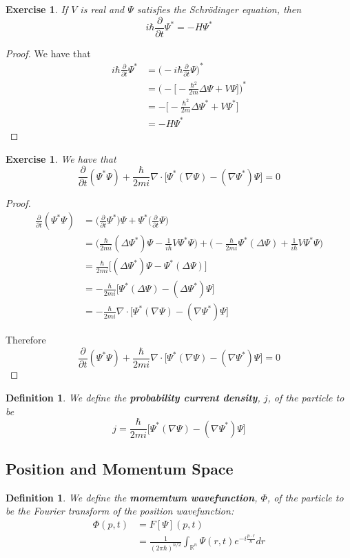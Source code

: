 \documentclass[12pt]{amsart}
\newtheorem{defn}[thm]{Definition}
\newtheorem{ex}[thm]{Exercise}
\newcommand{\Del}{\Delta}
\newcommand{\R}{\mathbb{R}}
\newcommand{\p}[1]{\frac{\partial}{\partial{#1}}}
\begin{document}
\begin{ex}
If $V$ is real and $\Psi$ satisfies the Schr\"{o}dinger equation, then $$i\hbar \p{t} \Psi^* = -H\Psi^* $$
\end{ex}

\begin{proof}
We have that 
\begin{align*}
i \hbar \p{t} \Psi^{*} 
&= \bigg(-i \hbar \p{t} \Psi\bigg)^*\\
&=\bigg( - \bigg[-\frac{\hbar^2}{2m}\Del \Psi + V \Psi \bigg] \bigg)^*\\
&= - \bigg[ -\frac{\hbar^2}{2m}\Del \Psi^* + V \Psi^*\bigg]\\
&= -H \Psi^*
\end{align*}
\end{proof}

\begin{ex}
We have that $$\p{t} (\Psi^* \Psi) + \frac{\hbar}{2mi} \nabla \cdot \bigg[ \Psi^* (\nabla \Psi) - (\nabla \Psi^*) \Psi\bigg] = 0 $$
\end{ex}

\begin{proof}
\begin{align*}
\p{t}(\Psi^* \Psi) 
&= \bigg(\p{t} \Psi^* \bigg) \Psi + \Psi^* \bigg(\p{t} \Psi \bigg)\\
&= \bigg( \frac{\hbar}{2mi} (\Del \Psi^*) \Psi - \frac{1}{i \hbar }V \Psi^* \Psi\bigg) + \bigg( -\frac{\hbar}{2mi}  \Psi^* (\Del \Psi) + \frac{1}{i \hbar }V \Psi^* \Psi \bigg)\\
&= \frac{\hbar}{2mi} \bigg[ (\Del \Psi^*) \Psi - \Psi^* (\Del \Psi) \bigg]\\
&= -\frac{\hbar}{2mi} \bigg[ \Psi^* (\Del \Psi) - (\Del \Psi^*) \Psi\bigg]\\
&= - \frac{\hbar}{2mi} \nabla \cdot \bigg[\Psi^* (\nabla \Psi) - (\nabla \Psi^*) \Psi \bigg]
\end{align*}

Therefore  $$\p{t} (\Psi^* \Psi) + \frac{\hbar}{2mi} \nabla \cdot \bigg[ \Psi^* (\nabla \Psi) - (\nabla \Psi^*) \Psi\bigg] = 0 $$
\end{proof}

\begin{defn}
We define the \textbf{probability current density}, $j$, of the particle to be $$j = \frac{\hbar}{2mi} \bigg[ \Psi^* (\nabla \Psi) - (\nabla \Psi^*) \Psi\bigg]$$ 
\end{defn}
\subsection{Position and Momentum Space}
\begin{defn}
We define the \textbf{momemtum wavefunction}, $\Phi$, of the particle to be the Fourier transform of the position wavefunction: 
\begin{align*}
\Phi(p,t) 
&= F[\Psi](p,t)\\
&= \frac{1}{(2 \pi \hbar)^{n/2}} \int_{\R ^n}\Psi(r,t)e^{-i \frac{p \cdot r}{\hbar} }dr 
\end{align*}
\end{defn}
\end{document}
